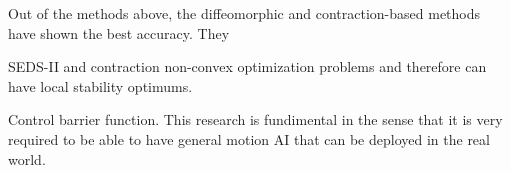 Out of the methods above, the diffeomorphic and contraction-based methods have shown the best accuracy. They 

SEDS-II and contraction non-convex optimization problems and therefore can have local stability optimums.

Control barrier function. This research is fundimental in the sense that it is very required to be able to have general motion AI that can be deployed in the real world.
